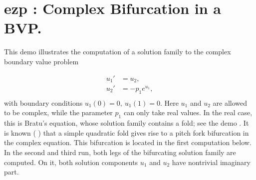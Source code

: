 \documentclass[12pt]{report}
\begin{document}
\section{ ezp : Complex Bifurcation in a BVP.} \label{sec:Demos_ezp}
This demo illustrates the computation of a solution family to
the complex boundary value problem

\begin{equation} \begin{array}{cl}
  u_1 ' &= u_2  ,  \\
  u_2 ' &= -p_1  e^{u_1} , \\
\end{array} \end{equation}
with boundary conditions $ u_1(0)=0 , ~u_1(1)=0.$
Here $u_1$ and $u_2$ are allowed to be complex, 
while the parameter $p_1$ can only take real values.
In the real case, this is Bratu's equation, whose solution family 
contains a fold; see the demo .
It is known 
( \citeyear{HeKe:90}) that a simple quadratic fold gives rise to a pitch fork
bifurcation in the complex equation.
This bifurcation is located in the first computation below.
In the second and third run, both legs of the bifurcating solution family
are computed.
On it, both solution components $u_1$ and $u_2$ have nontrivial 
imaginary part.
\end{document}
